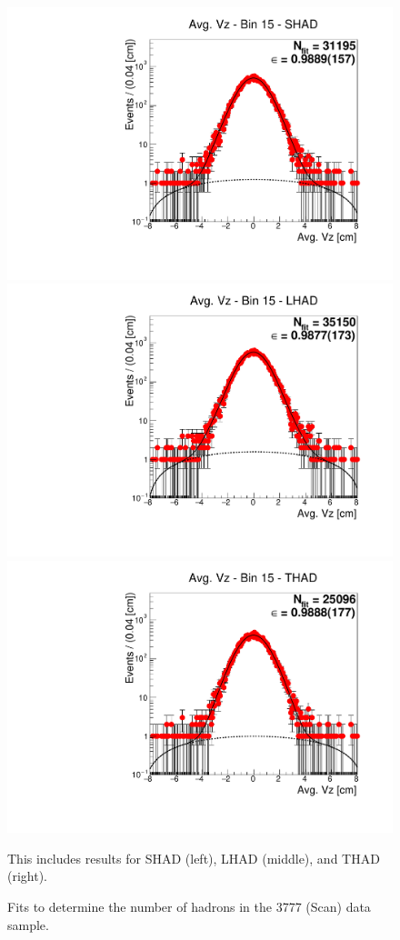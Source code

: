 \begin{figure}[H]
\centering
\includegraphics[scale=0.25]{figures/plots/nonDDbar_fit_results/scan/fit_scan_15_data_SHAD.pdf}
\hspace{-0.5cm}
\includegraphics[scale=0.25]{figures/plots/nonDDbar_fit_results/scan/fit_scan_15_data_LHAD.pdf}
\hspace{-0.5cm}
\includegraphics[scale=0.25]{figures/plots/nonDDbar_fit_results/scan/fit_scan_15_data_THAD.pdf}
\caption{Fits to determine the number of hadrons in the 3777 (Scan) data sample.}
{This includes results for SHAD (left), LHAD (middle), and THAD (right).}
\label{fig:hadron_fits_scan_15}
\end{figure}

